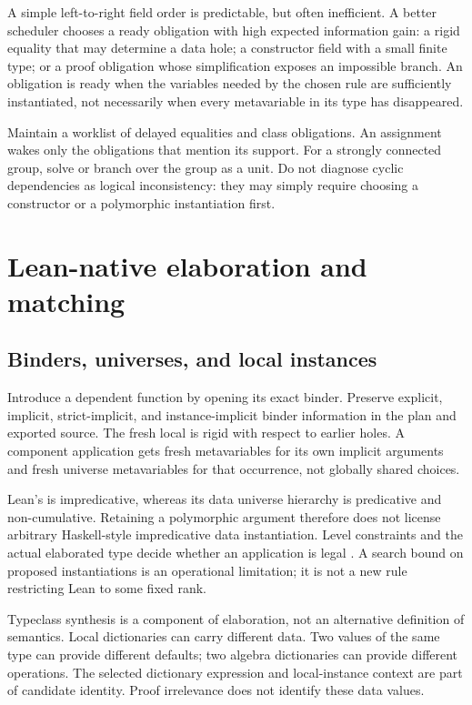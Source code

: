 \documentclass[11pt,letterpaper]{article}
\newcommand{\code}[1]{\texttt{\detokenize{#1}}}
\theoremstyle{definition}
\theoremstyle{remark}
\begin{document}
A simple left-to-right field order is predictable, but often inefficient. A better scheduler chooses a ready obligation with high expected information gain: a rigid equality that may determine a data hole; a constructor field with a small finite type; or a proof obligation whose simplification exposes an impossible branch. An obligation is ready when the variables needed by the chosen rule are sufficiently instantiated, not necessarily when every metavariable in its type has disappeared.

Maintain a worklist of delayed equalities and class obligations. An assignment wakes only the obligations that mention its support. For a strongly connected group, solve or branch over the group as a unit. Do not diagnose cyclic dependencies as logical inconsistency: they may simply require choosing a constructor or a polymorphic instantiation first.

\section{Lean-native elaboration and matching}
\label{sec:matching}

\subsection{Binders, universes, and local instances}

Introduce a dependent function by opening its exact binder. Preserve explicit, implicit, strict-implicit, and instance-implicit binder information in the plan and exported source. The fresh local is rigid with respect to earlier holes. A component application gets fresh metavariables for its own implicit arguments and fresh universe metavariables for that occurrence, not globally shared choices.

Lean's \code{Prop} is impredicative, whereas its data universe hierarchy is predicative and non-cumulative. Retaining a polymorphic argument therefore does not license arbitrary Haskell-style impredicative data instantiation. Level constraints and the actual elaborated type decide whether an application is legal \cite{leanmanual}. A search bound on proposed instantiations is an operational limitation; it is not a new rule restricting Lean to some fixed rank.

Typeclass synthesis is a component of elaboration, not an alternative definition of semantics. Local dictionaries can carry different data. Two values of the same \code{Inhabited Nat} type can provide different defaults; two algebra dictionaries can provide different operations. The selected dictionary expression and local-instance context are part of candidate identity. Proof irrelevance does not identify these data values.
\end{document}
